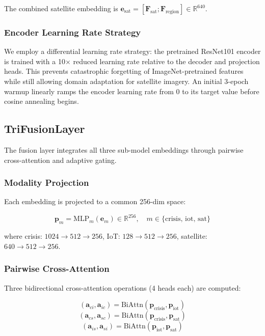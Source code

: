 \documentclass[journal]{IEEEtran}
\begin{document}
The combined satellite embedding is $\mathbf{e}_\text{sat} = [\mathbf{F}_\text{sat}; \mathbf{F}_\text{region}] \in \mathbb{R}^{640}$.

\subsubsection{Encoder Learning Rate Strategy}

We employ a differential learning rate strategy: the pretrained ResNet101 encoder is trained with a 10$\times$ reduced learning rate relative to the decoder and projection heads. This prevents catastrophic forgetting of ImageNet-pretrained features while still allowing domain adaptation for satellite imagery. An initial 3-epoch warmup linearly ramps the encoder learning rate from 0 to its target value before cosine annealing begins.

\subsection{TriFusionLayer}

The fusion layer integrates all three sub-model embeddings through pairwise cross-attention and adaptive gating.

\subsubsection{Modality Projection}

Each embedding is projected to a common 256-dim space:

\begin{equation}
\mathbf{p}_m = \text{MLP}_m(\mathbf{e}_m) \in \mathbb{R}^{256}, \quad m \in \{\text{crisis, iot, sat}\}
\end{equation}

where crisis: $1024 \to 512 \to 256$, IoT: $128 \to 512 \to 256$, satellite: $640 \to 512 \to 256$.

\subsubsection{Pairwise Cross-Attention}

Three bidirectional cross-attention operations (4 heads each) are computed:

\begin{equation}
(\mathbf{a}_{ci}, \mathbf{a}_{ic}) = \text{BiAttn}(\mathbf{p}_\text{crisis}, \mathbf{p}_\text{iot})
\end{equation}
\begin{equation}
(\mathbf{a}_{cs}, \mathbf{a}_{sc}) = \text{BiAttn}(\mathbf{p}_\text{crisis}, \mathbf{p}_\text{sat})
\end{equation}
\begin{equation}
(\mathbf{a}_{is}, \mathbf{a}_{si}) = \text{BiAttn}(\mathbf{p}_\text{iot}, \mathbf{p}_\text{sat})
\end{equation}
\end{document}

